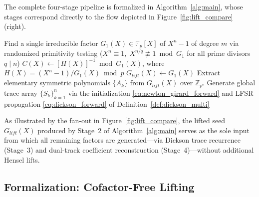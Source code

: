 \documentclass[12pt]{article}
\theoremstyle{plain}
\begin{document}
The complete four-stage pipeline is formalized in Algorithm~\ref{alg:main}, whose stages correspond directly to the flow depicted in Figure~\ref{fig:lift_compare} (right).

\begin{algorithm}[h!]
\caption{Cofactor-Free Factorization of $X^n-1$ over $\mathbb{Z}_{p^e}$} \label{alg:main}
Find a single irreducible factor $G_1(X) \in \mathbb{F}_p[X]$ of $X^n-1$ of degree $m$ via randomized primitivity testing ($X^n \equiv 1, \; X^{n/q} \not\equiv 1 \bmod G_1$ for all prime divisors $q \mid n$)\;
$C(X) \leftarrow [H(X)]^{-1} \bmod G_1(X)$, where $H(X) = (X^n-1)/G_1(X) \bmod p$ \quad {}
$G_{lift}(X) \leftarrow G_1(X)$\;
Extract elementary symmetric polynomials $\{A_k\}$ from $G_{lift}(X)$ over $\mathbb{Z}_{p^e}$\;
Generate global trace array $\{S_k\}_{k=1}^{n}$ via the initialization \eqref{eq:newton_girard_forward} and LFSR propagation \eqref{eq:dickson_forward} of Definition~\ref{def:dickson_multi}\;
\end{algorithm}

As illustrated by the fan-out in Figure~\ref{fig:lift_compare}, the lifted seed $G_{lift}(X)$ produced by Stage~2 of Algorithm~\ref{alg:main} serves as the sole input from which all remaining factors are generated---via Dickson trace recurrence (Stage~3) and dual-track coefficient reconstruction (Stage~4)---without additional Hensel lifts.

\subsection{Formalization: Cofactor-Free Lifting}
\end{document}
